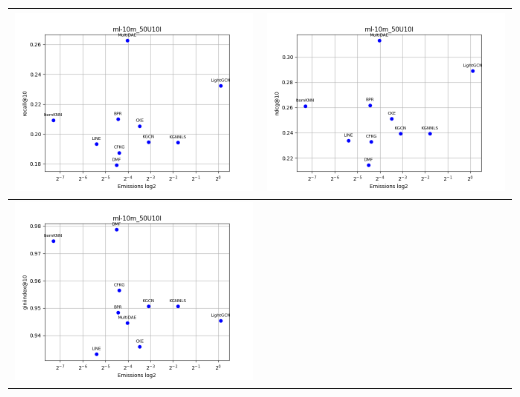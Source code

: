 \begin{table}[H]
    \centering
    \footnotesize
    \setlength\tabcolsep{0pt}
    \begin{tabularx}{\textwidth}{|X|X|}
        \hline
        \includegraphics[width=\linewidth, trim=0 0 0 0]{images/recall@10_ml-10m_50U10I.png} &
        \includegraphics[width=\linewidth, trim=0 0 0 0]{images/ndcg@10_ml-10m_50U10I.png} \\
        \hline
        \includegraphics[width=\linewidth, trim=0 0 0 0]{images/giniindex@10_ml-10m_50U10I.png} &

\end{tabularx}
\end{table}
